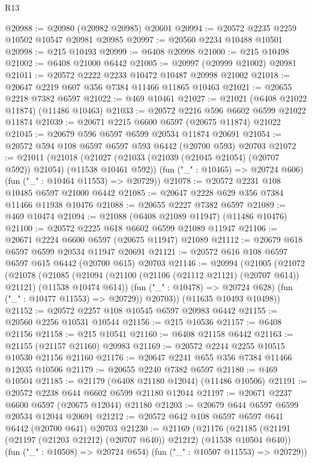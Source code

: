 \begin{lexlean}{R13}
\begin{coremodule}
@20988 := @20980 (@20982 @20985) @20601
@20994 := @20572 @2235 @2259 @10502 @10547 @20981 @20985
@20997 := @20560 @2234 @10488 @10501
@20998 := @215 @10493
@20999 := @6408 @20998
@21000 := @215 @10498
@21002 := @6408 @21000 @6442
@21005 := @20997 (@20999 @21002) @20981
@21011 := @20572 @2222 @2233 @10472 @10487 @20998 @21002
@21018 := @20647 @2219 @607 @356 @7384 @11466 @11865 @10463
@21021 := @20655 @2218 @7382 @6597
@21022 := @469 @10461
@21027 := @21021 (@6408 @21022 @11874) (@11486 @10463)
@21033 := @20572 @2216 @596 @6602 @6599 @21022 @11874
@21039 := @20671 @2215 @6600 @6597 (@20675 @11874) @21022
@21045 := @20679 @596 @6597 @6599 @20534 @11874 @20691
@21054 := @20572 @594 @108 @6597 @6597 @593 @6442 (@20700 @593) @20703
@21072 := @21011
    (@21018
      (@21027 (@21033 (@21039 (@21045 @21054) (@20707 @592)) @21054) (@11538 @10461 @592))
      (fun ("_" : @10465) => @20724 @606)
      (fun ("_" : @10464 @11553) => @20729))
@21078 := @20572 @2231 @108 @10485 @6597 @21000 @6442
@21085 := @20647 @2228 @629 @356 @7384 @11466 @11938 @10476
@21088 := @20655 @2227 @7382 @6597
@21089 := @469 @10474
@21094 := @21088 (@6408 @21089 @11947) (@11486 @10476)
@21100 := @20572 @2225 @618 @6602 @6599 @21089 @11947
@21106 := @20671 @2224 @6600 @6597 (@20675 @11947) @21089
@21112 := @20679 @618 @6597 @6599 @20534 @11947 @20691
@21121 := @20572 @616 @108 @6597 @6597 @615 @6442 (@20700 @615) @20703
@21146 := @20994
    (@21005
      (@21072
        (@21078
          (@21085
            (@21094 (@21100 (@21106 (@21112 @21121) (@20707 @614)) @21121) (@11538 @10474 @614))
            (fun ("_" : @10478) => @20724 @628)
            (fun ("_" : @10477 @11553) => @20729))
          @20703))
      (@11635 @10493 @10498))
@21152 := @20572 @2257 @108 @10545 @6597 @20983 @6442
@21155 := @20560 @2256 @10531 @10544
@21156 := @215 @10536
@21157 := @6408 @21156
@21158 := @215 @10541
@21160 := @6408 @21158 @6442
@21163 := @21155 (@21157 @21160) @20983
@21169 := @20572 @2244 @2255 @10515 @10530 @21156 @21160
@21176 := @20647 @2241 @655 @356 @7384 @11466 @12035 @10506
@21179 := @20655 @2240 @7382 @6597
@21180 := @469 @10504
@21185 := @21179 (@6408 @21180 @12044) (@11486 @10506)
@21191 := @20572 @2238 @644 @6602 @6599 @21180 @12044
@21197 := @20671 @2237 @6600 @6597 (@20675 @12044) @21180
@21203 := @20679 @644 @6597 @6599 @20534 @12044 @20691
@21212 := @20572 @642 @108 @6597 @6597 @641 @6442 (@20700 @641) @20703
@21230 := @21169
    (@21176
      (@21185 (@21191 (@21197 (@21203 @21212) (@20707 @640)) @21212) (@11538 @10504 @640))
      (fun ("_" : @10508) => @20724 @654)
      (fun ("_" : @10507 @11553) => @20729))

\end{coremodule}
\end{lexlean}
